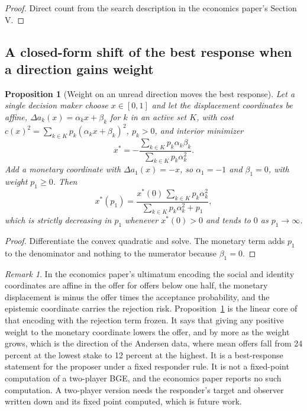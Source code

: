 \documentclass[11pt]{article}
\newtheorem{proposition}{Proposition}
\theoremstyle{definition}
\theoremstyle{remark}
\newtheorem*{remark}{Remark}
\begin{document}
\begin{proof}
Direct count from the search description in the economics paper's Section V.
\end{proof}

\subsection{A closed-form shift of the best response when a direction gains weight}

\begin{proposition}[Weight on an unread direction moves the best response]
\label{prop:shift}
Let a single decision maker choose $x\in[0,1]$ and let the displacement coordinates be affine, $\Delta a_{k}(x)=\alpha_{k}x+\beta_{k}$ for $k$ in an active set $K$, with cost $c(x)^{2}=\sum_{k\in K}p_{k}(\alpha_{k}x+\beta_{k})^{2}$, $p_{k}>0$, and interior minimizer
\[
x^{*}=-\frac{\sum_{k\in K}p_{k}\alpha_{k}\beta_{k}}{\sum_{k\in K}p_{k}\alpha_{k}^{2}}.
\]
Add a monetary coordinate with $\Delta a_{1}(x)=-x$, so $\alpha_{1}=-1$ and $\beta_{1}=0$, with weight $p_{1}\ge0$. Then
\[
x^{*}(p_{1})=\frac{x^{*}(0)\,\sum_{k\in K}p_{k}\alpha_{k}^{2}}{\sum_{k\in K}p_{k}\alpha_{k}^{2}+p_{1}},
\]
which is strictly decreasing in $p_{1}$ whenever $x^{*}(0)>0$ and tends to $0$ as $p_{1}\to\infty$.
\end{proposition}

\begin{proof}
Differentiate the convex quadratic and solve. The monetary term adds $p_{1}$ to the denominator and nothing to the numerator because $\beta_{1}=0$.
\end{proof}

\begin{remark}
In the economics paper's ultimatum encoding the social and identity coordinates are affine in the offer for offers below one half, the monetary displacement is minus the offer times the acceptance probability, and the epistemic coordinate carries the rejection risk.
Proposition~\ref{prop:shift} is the linear core of that encoding with the rejection term frozen.
It says that giving any positive weight to the monetary coordinate lowers the offer, and by more as the weight grows, which is the direction of the Andersen data, where mean offers fall from 24 percent at the lowest stake to 12 percent at the highest.
It is a best-response statement for the proposer under a fixed responder rule.
It is not a fixed-point computation of a two-player BGE, and the economics paper reports no such computation.
A two-player version needs the responder's target and observer written down and its fixed point computed, which is future work.
\end{remark}
\end{document}
